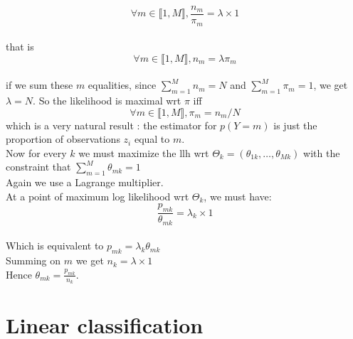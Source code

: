 \documentclass[11pt,a4paper]{article}
\begin{document}
 $$\forall m \in \llbracket 1, M \rrbracket, \frac{n_m}{\pi_m} = \lambda \times 1$$
\\that is 
$$\forall m \in \llbracket 1, M \rrbracket, n_m = \lambda \pi_m$$
\\if we sum these $m$ equalities, since $\sum\limits_{m=1}^{M} n_m = N$ and $\sum\limits_{m=1}^{M} \pi_m = 1$, we get $\lambda = N$.
So the likelihood is maximal wrt $\pi$ iff $$\forall m \in \llbracket 1, M \rrbracket,  \pi_m = n_m/N$$
which is a very natural result : the estimator for $p(Y=m)$ is just the proportion of observations $z_i$ equal to $m$.
%
\\[5mm]Now for every $k$ we must maximize the llh wrt $\Theta_k = (\theta_{1k}, \ldots, \theta_{Mk})$ with the constraint that $ \sum\limits_{m=1}^{M}  \theta_{mk} = 1$
\\Again we use a Lagrange multiplier.
\\At a point of maximum log likelihood wrt $\Theta_k$, we must have:
%
$$\frac{p_{mk}}{ \theta_{mk}} = \lambda_k \times 1$$
\\Which is equivalent to $p_{mk} = \lambda_k \theta_{mk}$
\\Summing on $m$ we get $n_k = \lambda \times 1$
\\Hence $\theta_{mk} = \frac{p_{mk}}{n_k}$.

%
%
%
%
\section{Linear classification}
%
%
%
\end{document}

